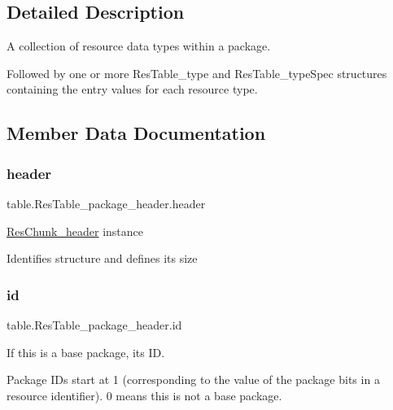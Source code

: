 \subsection{Detailed Description}
A collection of resource data types within a package. 

Followed by one or more Res\+Table\+\_\+type and Res\+Table\+\_\+type\+Spec structures containing the entry values for each resource type. 

\subsection{Member Data Documentation}
\mbox{\label{classtable_1_1ResTable__package__header_ab1b00c59b78bb166b4badd2bd8349986}} 
\subsubsection{\texorpdfstring{header}{header}}
{\footnotesize\ttfamily table.\+Res\+Table\+\_\+package\+\_\+header.\+header}



\mbox{\hyperlink{}{Res\+Chunk\+\_\+header}} instance 

Identifies structure and defines its size \mbox{\label{classtable_1_1ResTable__package__header_aec6d0c7306dc2db3cffe486b13b32710}} 
\subsubsection{\texorpdfstring{id}{id}}
{\footnotesize\ttfamily table.\+Res\+Table\+\_\+package\+\_\+header.\+id}



If this is a base package, its ID. 

Package I\+Ds start at 1 (corresponding to the value of the package bits in a resource identifier). 0 means this is not a base package. \mbox{\label{classtable_1_1ResTable__package__header_ac1a009f4b944a30835e07f3e0f204161}} 
